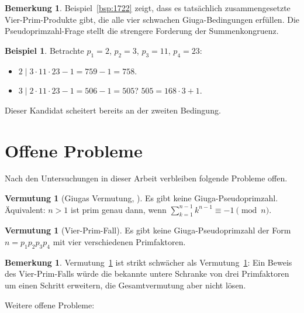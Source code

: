 \documentclass[12pt,a4paper]{amsart}
\theoremstyle{definition}
\newtheorem{example}[theorem]{Beispiel}
\newtheorem{remark}[theorem]{Bemerkung}
\newtheorem{conjecture}[theorem]{Vermutung}
\begin{document}
\begin{remark}
Beispiel~\ref{bsp:1722} zeigt, dass es tatsächlich zusammengesetzte
Vier-Prim-Produkte gibt, die alle vier schwachen Giuga-Bedingungen erfüllen.
Die Pseudoprimzahl-Frage stellt die strengere Forderung der Summenkongruenz.
\end{remark}

\begin{example}
\label{bsp:keine}
Betrachte $p_1 = 2$, $p_2 = 3$, $p_3 = 11$, $p_4 = 23$:
\begin{itemize}
  \item $2 \mid 3 \cdot 11 \cdot 23 - 1 = 759 - 1 = 758$. \checkmark
  \item $3 \mid 2 \cdot 11 \cdot 23 - 1 = 506 - 1 = 505$?  $505 = 168 \cdot 3 + 1$. \texttimes
\end{itemize}
Dieser Kandidat scheitert bereits an der zweiten Bedingung.
\end{example}

\section{Offene Probleme}
\label{sec:offen}

Nach den Untersuchungen in dieser Arbeit verbleiben folgende Probleme offen.

\begin{conjecture}[Giugas Vermutung, {\cite{Giuga1950}}]
\label{verm:giuga}
Es gibt keine Giuga-Pseudoprimzahl.  Äquivalent: $n > 1$ ist prim genau dann,
wenn $\sum_{k=1}^{n-1} k^{n-1} \equiv -1 \pmod{n}$.
\end{conjecture}

\begin{conjecture}[Vier-Prim-Fall]
\label{verm:vierprim}
Es gibt keine Giuga-Pseudoprimzahl der Form $n = p_1 p_2 p_3 p_4$ mit vier
verschiedenen Primfaktoren.
\end{conjecture}

\begin{remark}
Vermutung~\ref{verm:vierprim} ist strikt schwächer als
Vermutung~\ref{verm:giuga}: Ein Beweis des Vier-Prim-Falls würde die bekannte
untere Schranke von drei Primfaktoren um einen Schritt erweitern, die
Gesamtvermutung aber nicht lösen.
\end{remark}

Weitere offene Probleme:
\end{document}
